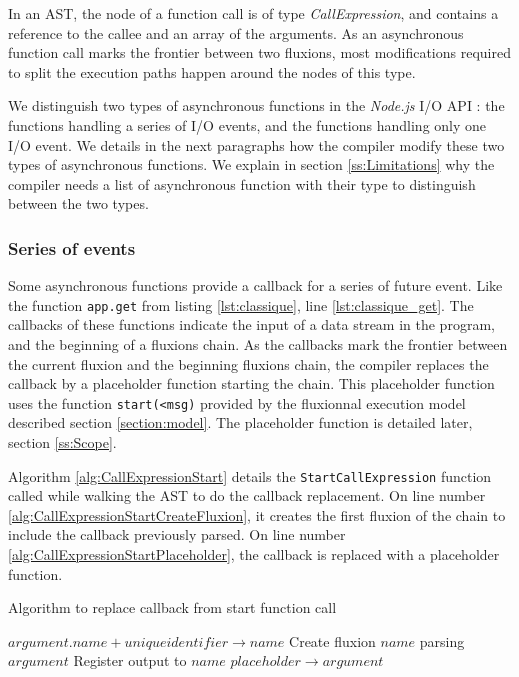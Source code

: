 In an AST, the node of a function call is of type \textit{CallExpression}, and contains a reference to the callee and an array of the arguments.
As an asynchronous function call marks the frontier between two fluxions, most modifications required to split the execution paths happen around the nodes of this type.

We distinguish two types of asynchronous functions in the \textit{Node.js} I/O API : the functions handling a series of I/O events, and the functions handling only one I/O event.
We details in the next paragraphs how the compiler modify these two types of asynchronous functions.
We explain in section \ref{ss:Limitations} why the compiler needs a list of asynchronous function with their type to distinguish between the two types.







\subsubsection{Series of events} \label{sss:start}

Some asynchronous functions provide a callback for a series of future event.
Like the function \texttt{app.get} from listing \ref{lst:classique}, line \ref{lst:classique_get}.
The callbacks of these functions indicate the input of a data stream in the program, and the beginning of a fluxions chain.
As the callbacks mark the frontier between the current fluxion and the beginning fluxions chain, the compiler replaces the callback by a placeholder function starting the chain.
This placeholder function uses the function \texttt{start(<msg)} provided by the fluxionnal execution model described section \ref{section:model}.
The placeholder function is detailed later, section \ref{ss:Scope}.

Algorithm \ref{alg:CallExpressionStart} details the \texttt{StartCallExpression} function called while walking the AST to do the callback replacement.
On line number \ref{alg:CallExpressionStartCreateFluxion}, it creates the first fluxion of the chain to include the callback previously parsed.
On line number \ref{alg:CallExpressionStartPlaceholder}, the callback is replaced with a placeholder function.

\begin{algorithm}
\caption{Algorithm to replace callback from start function call}
\label{alg:CallExpressionStart}
\begin{algorithmic}[1]
\State $argument.name + unique identifier \to name$
\State Create fluxion $name$ parsing $argument$ \label{alg:CallExpressionStartCreateFluxion}
\State Register output to $name$
\State $placeholder \to argument$ \label{alg:CallExpressionStartPlaceholder}
\EndIf
\EndFor
\EndFunction
\end{algorithmic}
\end{algorithm}

